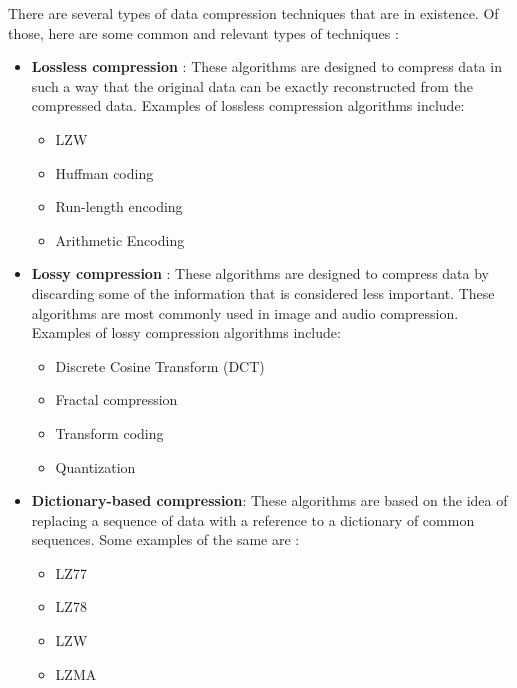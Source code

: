 There are several types of data compression techniques that are in existence. Of those, here are some common and relevant types of techniques : 

\begin{itemize}


    \item \textbf{Lossless compression} : These algorithms are designed to compress data in such a way that the original data can be exactly reconstructed from the compressed data. Examples of lossless compression algorithms include:
    \begin{itemize}
        \item LZW
        \item Huffman coding
        \item Run-length encoding
        \item Arithmetic Encoding
    \end{itemize} 


    \item \textbf{Lossy compression} : These algorithms are designed to compress data by discarding some of the information that is considered less important. These algorithms are most commonly used in image and audio compression. Examples of lossy compression algorithms include:
    \begin{itemize}
        \item Discrete Cosine Transform (DCT)
        \item Fractal compression
        \item Transform coding
        \item Quantization
    \end{itemize} 

    
    \item \textbf{Dictionary-based compression}: These algorithms are based on the idea of replacing a sequence of data with a reference to a dictionary of common sequences.
    Some examples of the same are :
    \begin{itemize}
        \item LZ77
        \item LZ78
        \item LZW
        \item LZMA
    \end{itemize} 
    
\end{itemize}

